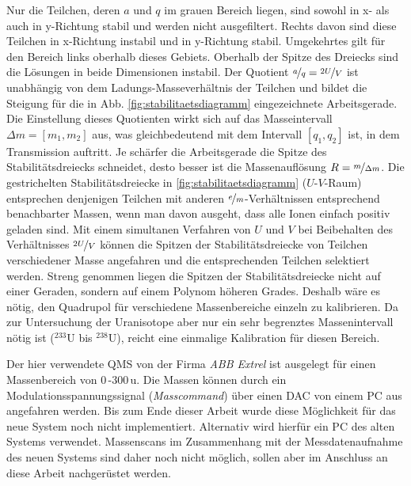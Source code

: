 Nur die Teilchen, deren $a$ und $q$ im grauen
Bereich liegen, sind sowohl in x- als auch in y-Richtung stabil und werden nicht
ausgefiltert. Rechts davon sind diese Teilchen in x-Richtung instabil und in
y-Richtung stabil. Umgekehrtes gilt für den Bereich links oberhalb dieses
Gebiets.
Oberhalb der Spitze des Dreiecks sind die Lösungen in beide Dimensionen
instabil.
Der Quotient $\nicefrac{a}{q}=\nicefrac{2U}{V}$ ist unabhängig von dem
Ladungs-Masseverhältnis der Teilchen und bildet die Steigung für die
in Abb. \ref{fig:stabilitaetsdiagramm} eingezeichnete Arbeitsgerade. Die
Einstellung dieses Quotienten wirkt sich auf das Masseintervall $\Delta m=[m_1,m_2]$ aus, was
gleichbedeutend mit dem Intervall $[q_1,q_2]$ ist, in dem Transmission auftritt.
Je schärfer die Arbeitsgerade die Spitze des Stabilitätsdreiecks schneidet,
desto besser ist die Massenauflösung $R=\nicefrac{m}{\Delta m}$. Die gestrichelten Stabilitätsdreiecke in
\ref{fig:stabilitaetsdiagramm}
($U$-$V$-Raum) entsprechen denjenigen Teilchen mit anderen
$\nicefrac{e}{m}$-Verhältnissen entsprechend benachbarter Massen, wenn man davon
ausgeht, dass alle Ionen einfach positiv geladen sind.
Mit einem simultanen Verfahren von $U$ und $V$ bei Beibehalten des Verhältnisses
$\nicefrac{2U}{V}$ können die Spitzen der Stabilitätsdreiecke von Teilchen verschiedener Masse angefahren und die entsprechenden Teilchen
selektiert werden. Streng genommen liegen die Spitzen der
Stabilitätsdreiecke nicht auf einer Geraden, sondern auf einem Polynom höheren
Grades. Deshalb wäre es nötig, den Quadrupol für verschiedene Massenbereiche
einzeln zu kalibrieren. Da zur Untersuchung der Uranisotope aber nur ein sehr
begrenztes Massenintervall nötig ist ($^{233}$U bis $^{238}$U), reicht eine
einmalige Kalibration für diesen Bereich.\par
Der hier verwendete QMS von der Firma \textit{ABB
Extrel} ist ausgelegt für einen Massenbereich von $0\,$-$300\,$u. Die Massen
können durch ein Modulationsspannungssignal (\textit{Masscommand}) über einen
DAC von einem PC aus angefahren werden. Bis zum Ende dieser Arbeit wurde diese
Möglichkeit für das neue System noch nicht implementiert. Alternativ wird
hierfür ein PC des alten Systems verwendet. Massenscans im Zusammenhang mit der
Messdatenaufnahme des neuen Systems sind daher noch nicht möglich, sollen aber
im Anschluss an diese Arbeit nachgerüstet werden.

